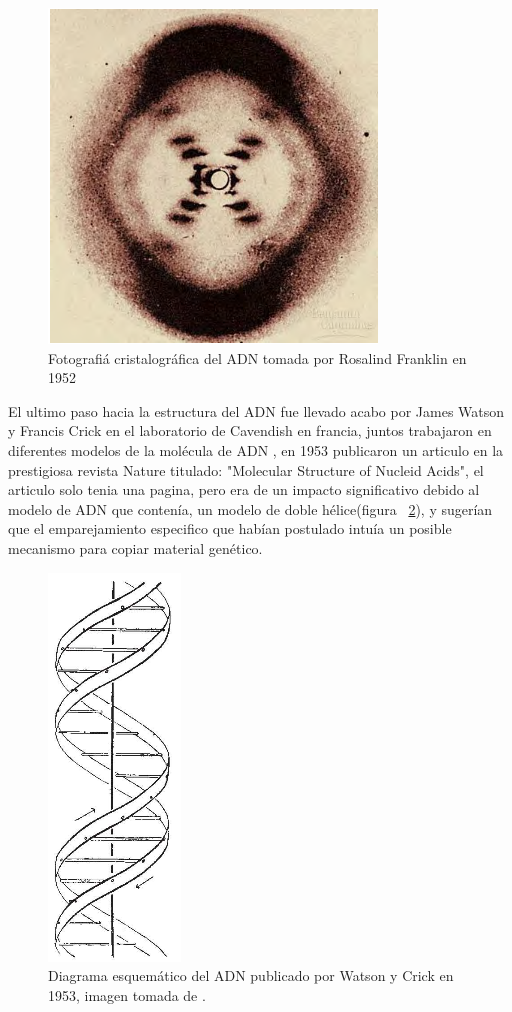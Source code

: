\begin{figure}[htbp]
    \centering
    \includegraphics[width=0.5\linewidth]{./Figures/RF.png}
    \caption[Fotografía cristalográfica del ADN]{Fotografiá cristalográfica del ADN tomada por Rosalind Franklin en 1952}
    \label{fig:rf}
\end{figure}
El ultimo paso hacia la estructura del ADN fue llevado acabo por James Watson y Francis Crick en el laboratorio de Cavendish en francia, juntos trabajaron en diferentes modelos de la molécula de ADN , en 1953 publicaron un articulo en la prestigiosa revista Nature titulado: "Molecular Structure of Nucleid Acids", el articulo solo tenia una pagina, pero era de un impacto significativo debido al modelo de ADN que contenía, un modelo de doble hélice(figura ~\ref{fig:jw}), y sugerían que el emparejamiento  especifico que habían postulado intuía un posible mecanismo para copiar material genético.
\begin{figure}[htbp]
    \centering
    \includegraphics[width=0.15\linewidth]{./Figures/DNA1.png}
    \caption[Diagrama esquemático del ADN]{Diagrama esquemático del ADN publicado por Watson y Crick en 1953, imagen tomada de \cite{jwfc}.}
    \label{fig:jw}
\end{figure}
